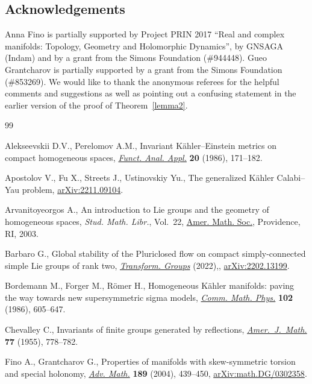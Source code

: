 \documentclass[pdftex]{sigma}
\numberwithin{equation}{section}
\begin{document}
\subsection*{Acknowledgements}

Anna Fino is partially supported by Project PRIN 2017 ``Real and complex manifolds: Topology, Geometry and Holomorphic Dynamics'', by GNSAGA (Indam) and by a grant from the Simons Foundation (\#944448). Gueo
Grantcharov is partially supported by a grant from the Simons
Foundation (\#853269). We would like to thank the anonymous referees for the helpful comments and suggestions as well as pointing out a confusing statement in the earlier version of the proof of Theorem~\ref{lemma2}.


\begin{thebibliography}{99}
\footnotesize\itemsep=0pt

Alekseevskii D.V., Perelomov A.M., Invariant {K}\"ahler--{E}instein metrics on
 compact homogeneous spaces, \href{https://doi.org/10.1007/BF01078469}{\textit{Funct. Anal. Appl.}} \textbf{20} (1986),
 171--182.

Apostolov V., Fu X., Streets J., Ustinovskiy Yu., The generalized K\"ahler
 Calabi--Yau problem, \href{https://arxiv.org/abs/2211.09104}{arXiv:2211.09104}.

Arvanitoyeorgos A., An introduction to {L}ie groups and the geometry of
 homogeneous spaces, \textit{Stud. Math. Libr.}, Vol.~22, \href{https://doi.org/10.1090/stml/022}{Amer. Math. Soc.},
 Providence, RI, 2003.

Barbaro G., Global stability of the {P}luriclosed flow on compact
 simply-connected simple {L}ie groups of rank two, \href{https://doi.org/10.1007/s00031-022-09761-5}{\textit{Transform. Groups}}
 (2022),, \href{https://arxiv.org/abs/2202.13199}{arXiv:2202.13199}.

Bordemann M., Forger M., R\"omer H., Homogeneous {K}\"ahler manifolds: paving
 the way towards new supersymmetric sigma models, \href{https://doi.org/10.1007/BF01221650}{\textit{Comm. Math. Phys.}}
 \textbf{102} (1986), 605--647.

Chevalley C., Invariants of finite groups generated by reflections,
 \href{https://doi.org/10.2307/2372597}{\textit{Amer.~J.~Math.}} \textbf{77} (1955), 778--782.

Fino A., Grantcharov G., Properties of manifolds with skew-symmetric torsion
 and special holonomy, \href{https://doi.org/10.1016/j.aim.2003.10.009}{\textit{Adv. Math.}} \textbf{189} (2004), 439--450,
 \href{https://arxiv.org/abs/math.DG/0302358}{arXiv:math.DG/0302358}.


\end{thebibliography}
\end{document}
